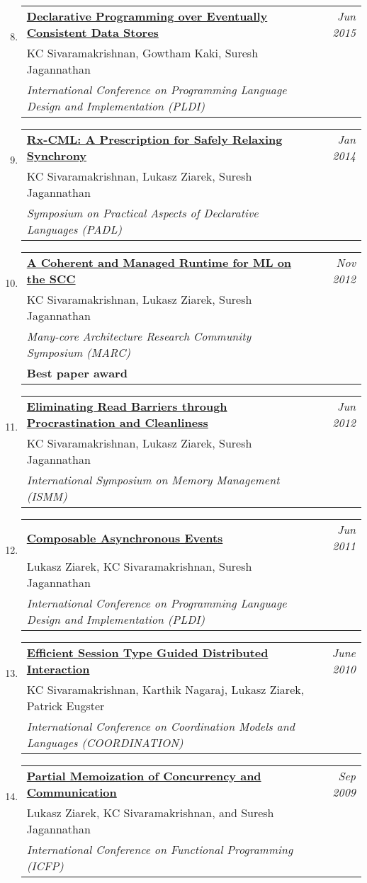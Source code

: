 \documentclass[10pt]{article}
\makeatletter
\newcommand{\lbar}[1]{{\color{#1}\ding{118}}\hspace*{2pt}}
\newenvironment{benumerate}[2]{
    \let\oldItem\item
    \def\item{\addtocounter{enumi}{-2}\oldItem}
    \begin{enumerate}[#2]
    \setcounter{enumi}{#1}
    \addtocounter{enumi}{1}}
  {\end{enumerate}}
\newenvironment{publication}[5]
{ \item
  \begin{tabular*}{7.5in}{p{6.3in}@{\extracolsep{\fill}}r}
    \href{#1}{\textbf{#2}} & \textit{#3}\\ #4 &\\ \textit{#5}&\\
  \end{tabular*}
} {}
\newenvironment{publicationNote}[6]
{ \item
  \begin{tabular*}{7.5in}{p{6.3in}@{\extracolsep{\fill}}r}
    \href{#1}{\textbf{#2}} & \textit{#3}\\ #4 &\\ \textit{#5}\\ \textbf{#6} \\
  \end{tabular*}
} {}
\newenvironment{region}[3]{%
  \vspace*{0.5ex}
  {\scalebox{1.4}{\textbf{#1}}}
  \begin{benumerate}{#3}{\color{RoyalBlue}#2}}
  {\end{benumerate}\vspace{1ex}}
\makeatother
\begin{document}
\begin{region} {\lbar{purple}Conference Publications}{{C}1}{7}
	\begin{publication} {http://kcsrk.info/papers/quelea_pldi15.pdf}
		{Declarative Programming over Eventually Consistent Data Stores}
		{Jun 2015} {KC Sivaramakrishnan, Gowtham Kaki, Suresh Jagannathan}
		{International Conference on Programming Language Design and Implementation (PLDI)}
	\end{publication}

	\begin{publication}{http://kcsrk.info/papers/rxcml_padl14.pdf}
		{Rx-CML: A Prescription for Safely Relaxing Synchrony}
		{Jan 2014}{KC Sivaramakrishnan, Lukasz Ziarek, Suresh Jagannathan}
		{Symposium on Practical Aspects of Declarative Languages (PADL)}
	\end{publication}

	\begin{publicationNote}{http://kcsrk.info/papers/mmscc_marc12.pdf}
		{A Coherent and Managed Runtime for ML on the SCC}
		{Nov 2012}{KC Sivaramakrishnan, Lukasz Ziarek, Suresh Jagannathan}
		{Many-core Architecture Research Community Symposium (MARC)}
		{Best paper award}
	\end{publicationNote}

	\begin{publication}{http://kcsrk.info/papers/mmgc_ismm12.pdf}
		{Eliminating Read Barriers through Procrastination and Cleanliness}
		{Jun 2012}{KC Sivaramakrishnan, Lukasz Ziarek, Suresh Jagannathan}
		{International Symposium on Memory Management (ISMM)}
	\end{publication}

	\begin{publication}{http://kcsrk.info/papers/acml_pldi11.pdf}
		{Composable Asynchronous Events}
		{Jun 2011}{Lukasz Ziarek, KC Sivaramakrishnan, Suresh Jagannathan}
		{International Conference on Programming Language Design and Implementation (PLDI)}
	\end{publication}

	\begin{publication}{http://kcsrk.info/papers/sting_coordination10.pdf}
		{Efficient Session Type Guided Distributed Interaction}
		{June 2010}{KC Sivaramakrishnan, Karthik Nagaraj, Lukasz Ziarek, Patrick Eugster}
		{International Conference on Coordination Models and Languages (COORDINATION)}
	\end{publication}

	\begin{publication}{http://kcsrk.info/papers/memo_icfp09.pdf}
		{Partial Memoization of Concurrency and Communication}
		{Sep 2009}{Lukasz Ziarek, KC Sivaramakrishnan, and Suresh Jagannathan}
		{International Conference on Functional Programming (ICFP)}
	\end{publication}
\end{region}
\end{document}
